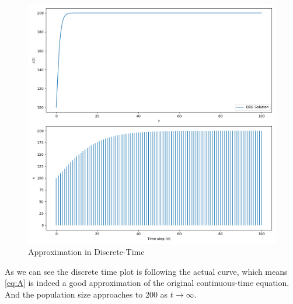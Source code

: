 \documentclass[journal,12pt,twocolumn]{IEEEtran}
\theoremstyle{remark}
\begin{document}
\begin{figure}[h]
    \centering
    \includegraphics[width=\columnwidth]{figs/diff.png}
    \caption{Approximation in Discrete-Time}
\end{figure}
\newline
As we can see the discrete time plot is following the actual curve, which means \eqref{eq:A} is indeed a good approximation of the original continuous-time equation.
\newline
And the population size approaches to 200 as $t \rightarrow \infty$.
\end{document}
